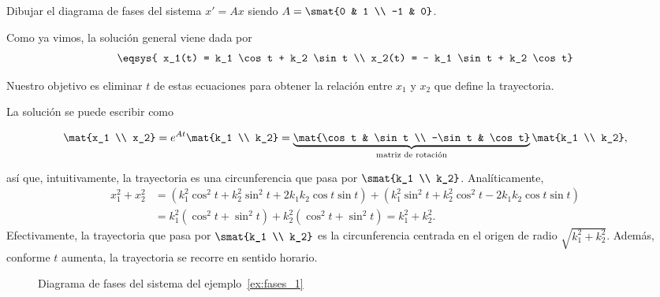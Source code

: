 \documentclass[../ecuaciones_diferenciales.tex]{subfiles}
\begin{document}
\begin{example}\label{ex:fases_1}
	Dibujar el diagrama de fases del sistema \(x' = Ax\) siendo
	\(A = \smat{0 & 1 \\ -1 & 0}\).

	Como ya vimos, la solución general viene dada por
	\[\eqsys{
			x_1(t) = k_1 \cos t + k_2 \sin t \\
			x_2(t) = - k_1 \sin t + k_2 \cos t}\]

	Nuestro objetivo es eliminar \(t\) de estas ecuaciones para obtener la
	relación entre \(x_1\) y \(x_2\) que define la trayectoria.

	La solución se puede escribir como

	\[\mat{x_1 \\ x_2} = e^{At}\mat{k_1 \\ k_2} =
		\underbrace{\mat{\cos t & \sin t \\ -\sin t & \cos t}}_{\text{matriz de
				rotación}} \mat{k_1 \\ k_2},\]

	así que, intuitivamente, la trayectoria es una circunferencia que pasa por
	\(\smat{k_1 \\ k_2}\). Analíticamente,
	\begin{align*}
		x_1^2 + x_2^2 & = (k_1^2\cos^2t + k_2^2\sin^2t + 2k_1k_2\cos t \sin t)
		+ (k_1^2\sin^2t + k_2^2\cos^2t - 2k_1k_2\cos t \sin t)                                 \\
		              & = k_1^2(\cos^2 t + \sin^2 t) + k_2^2(\cos^2t + \sin^2t) = k_1^2+k_2^2.
	\end{align*}
	Efectivamente, la trayectoria que pasa por \(\smat{k_1 \\ k_2}\) es la
	circunferencia centrada en el origen de radio \(\sqrt{k_1^2+k_2^2}\). Además,
	conforme \(t\) aumenta, la trayectoria se recorre en sentido horario.
\end{example}

\begin{figure}[ht]
	\centering
	\caption{Diagrama de fases del sistema del ejemplo~\ref{ex:fases_1}}
\end{figure}
\end{document}
